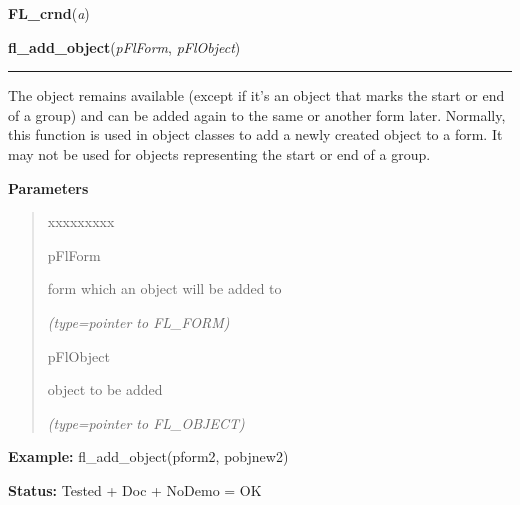     \label{xformslib:flbasic:FL_crnd}

    \vspace{0.5ex}

\hspace{.8\funcindent}\begin{boxedminipage}{\funcwidth}

    \raggedright \textbf{FL\_crnd}(\textit{a})

\setlength{\parskip}{2ex}
\setlength{\parskip}{1ex}
    \end{boxedminipage}

    \label{xformslib:flbasic:fl_add_object}

    \vspace{0.5ex}

\hspace{.8\funcindent}\begin{boxedminipage}{\funcwidth}

    \raggedright \textbf{fl\_add\_object}(\textit{pFlForm}, \textit{pFlObject})

    \vspace{-1.5ex}

    \rule{\textwidth}{0.5\fboxrule}
\setlength{\parskip}{2ex}
    The object remains available (except if it's an object that marks the 
    start or end of a group) and can be added again to the same or another 
    form later. Normally, this function is used in object classes to add a 
    newly created object to a form. It may not be used for objects 
    representing the start or end of a group.

\setlength{\parskip}{1ex}
      \textbf{Parameters}
      \vspace{-1ex}

      \begin{quote}
        \begin{Ventry}{xxxxxxxxx}

          \item[pFlForm]

          form which an object will be added to

            {\it (type=pointer to FL\_FORM)}

          \item[pFlObject]

          object to be added

            {\it (type=pointer to FL\_OBJECT)}

        \end{Ventry}

      \end{quote}

\textbf{Example:} fl\_add\_object(pform2, pobjnew2)



\textbf{Status:} Tested + Doc + NoDemo = OK



    \end{boxedminipage}

